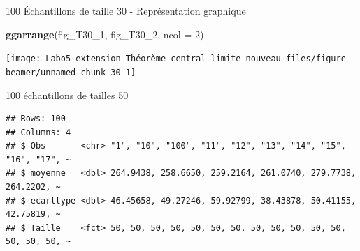 \documentclass[ignorenonframetext,]{beamer}
\newenvironment{Shaded}{\begin{snugshade}}{\end{snugshade}}
\newcommand{\KeywordTok}[1]{\textcolor[rgb]{0.13,0.29,0.53}{\textbf{#1}}}
\newcommand{\DataTypeTok}[1]{\textcolor[rgb]{0.13,0.29,0.53}{#1}}
\newcommand{\DecValTok}[1]{\textcolor[rgb]{0.00,0.00,0.81}{#1}}
\newcommand{\StringTok}[1]{\textcolor[rgb]{0.31,0.60,0.02}{#1}}
\newcommand{\OtherTok}[1]{\textcolor[rgb]{0.56,0.35,0.01}{#1}}
\newcommand{\OperatorTok}[1]{\textcolor[rgb]{0.81,0.36,0.00}{\textbf{#1}}}
\newcommand{\NormalTok}[1]{#1}
\begin{document}
\begin{frame}[fragile]{100 Échantillons de taille 30 - Représentation
graphique}

\begin{Shaded}
\begin{Highlighting}[]
\KeywordTok{ggarrange}\NormalTok{(fig_T30_}\DecValTok{1}\NormalTok{, fig_T30_}\DecValTok{2}\NormalTok{, }\DataTypeTok{ncol =} \DecValTok{2}\NormalTok{)}
\end{Highlighting}
\end{Shaded}

\texttt{[image: Labo5\_extension\_Théorème\_central\_limite\_nouveau\_files/figure-beamer/unnamed-chunk-30-1]}

\end{frame}

\begin{frame}[fragile]{100 échantillons de tailles 50}

\begin{Shaded}
\end{Shaded}

\begin{verbatim}
## Rows: 100
## Columns: 4
## $ Obs       <chr> "1", "10", "100", "11", "12", "13", "14", "15", "16", "17", ~
## $ moyenne   <dbl> 264.9438, 258.6650, 259.2164, 261.0740, 279.7738, 264.2202, ~
## $ ecarttype <dbl> 46.45658, 49.27246, 59.92799, 38.43878, 50.41155, 42.75819, ~
## $ Taille    <fct> 50, 50, 50, 50, 50, 50, 50, 50, 50, 50, 50, 50, 50, 50, 50, ~
\end{verbatim}

\end{frame}
\end{document}
